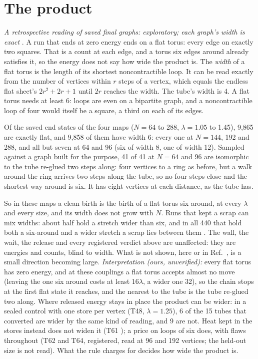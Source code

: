 \documentclass[aps,pre,10pt,twocolumn,superscriptaddress,nofootinbib]{revtex4-2}
\begin{document}
\section{The product}
\label{sec:product}

\emph{A retrospective reading of saved final graphs: exploratory; each graph's width is exact} \cite{repo}. A run
that ends at zero energy ends on a flat torus: every edge on exactly two squares. That is a count at each edge, and
a torus six edges around already satisfies it, so the energy does not say how wide the product is. The
\emph{width} of a flat torus is the length of its shortest noncontractible loop. It can be read exactly from the
number of vertices within $r$ steps of a vertex, which equals the endless flat sheet's $2r^2+2r+1$ until $2r$
reaches the width. The tube's width is 4. A flat torus needs at least 6: loops are even on a bipartite graph, and
a noncontractible loop of four would itself be a square, a third on each of its edges.

Of the saved end states of the four maps ($N=64$ to 288, $\lambda=1.05$ to 1.45), 9,865 are exactly flat, and 9,858
of them have width 6: every one at $N=144$, 192 and 288, and all but seven at 64 and 96 (six of width 8, one of
width 12). Sampled against a graph built for the purpose, 41 of 41 at $N=64$ and 96 are isomorphic to the tube
re-glued two steps along: four vertices to a ring as before, but a walk around the ring arrives two steps along the
tube, so no four steps close and the shortest way around is six. It has eight vertices at each distance, as the
tube has.

So in these maps a clean birth is the birth of a flat torus six around, at every $\lambda$ and every size, and its
width does not grow with $N$. Runs that kept a scrap can mix widths: about half hold a stretch wider than six, and
in all 440 that hold both a six-around and a wider stretch a scrap lies between them \cite{paper2}. The wall, the wait, the release and every registered verdict above are unaffected: they are
energies and counts, blind to width. What is not shown, here or
in Ref.~\cite{paper1}, is a small direction becoming large. \emph{Interpretation (ours, unverified):} every flat
torus has zero energy, and at these couplings a flat torus accepts almost no move (leaving the one six around costs at least $16\lambda$, a wider one 32), so the
chain stops at the first flat state it reaches, and the nearest to the tube is the tube re-glued two along. Where
released energy stays in place the product can be wider: in a sealed control with one store per vertex (T48,
$\lambda=1.25$), 6 of the 15 tubes that converted are wider by the same kind of reading, and 9 are not. Heat kept
in the stores instead does not widen it (T61 \cite{paper1}); a price on loops of six does, with flaws throughout
(T62 and T64, registered, read at 96 and 192 vertices; the held-out size is not read). What the rule charges
for decides how wide the product is.
\end{document}
